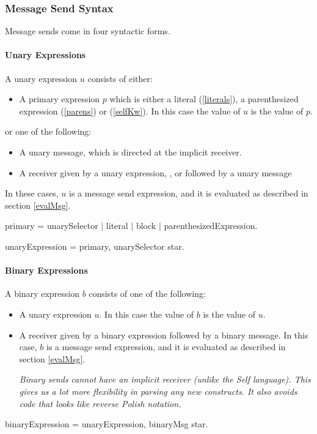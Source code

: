 \documentclass{article}
\begin{document}
\subsubsection{Message Send Syntax}

Message sends  come in four syntactic forms. 

\paragraph{Unary Expressions}
\label{unary}

A unary expression $u$ consists of either:
\begin{itemize}
\item A primary expression $p$ which is either a literal (\ref{literals}), a parenthesized expression (\ref{parens}) or \SELF{} (\ref{selfKw}). In this case  the value of $u$ is the value of $p$.
\end{itemize}
or one of the following:
\begin{itemize}
\item A unary message,  which is directed at the implicit receiver.
\item A receiver given by a unary expression, \OUTER{}, or \SUPER{} followed by a unary message
\end{itemize}
In these cases, $u$ is a message send expression, and it is evaluated as described in section \ref{evalMsg}.
\begin{newspeak}
primary =  unarySelector $|$
               literal $|$
               block $|$ 
               parenthesizedExpression.
 
unaryExpression = primary, unarySelector star.
\end{newspeak}


\paragraph{Binary Expressions}
\label{binary}

A binary expression $b$ consists of one of the following:
\begin{itemize}
\item A  unary expression $u$. In this case  the value of $b$ is the value of $u$.
\item A receiver given by a binary expression followed by a binary message. In this case, $b$ is a message send expression, and it is evaluated as described in section \ref{evalMsg}.

{\it
Binary sends cannot have an implicit receiver (unlike the Self language).  This gives us a lot more flexibility in parsing any new constructs. It also avoids code that looks like reverse Polish notation.
}

\end{itemize}
\begin{newspeak}
binaryExpression =  unaryExpression, binaryMsg star.
\end{newspeak}
\end{document}
